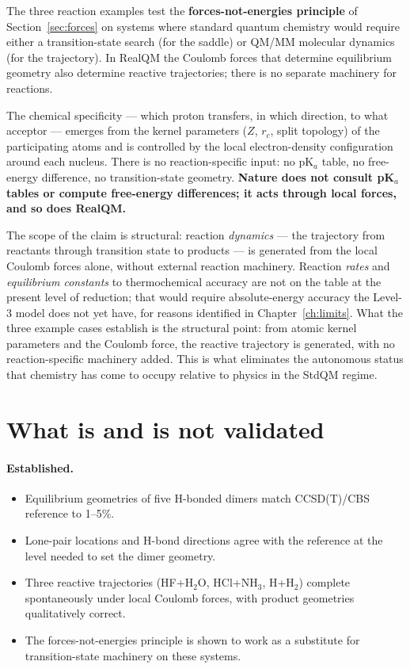 The three reaction examples test the \textbf{forces-not-energies principle} of Section~\ref{sec:forces} on systems where standard quantum chemistry would require either a transition-state search (for the saddle) or QM/MM molecular dynamics (for the trajectory). In RealQM the Coulomb forces that determine equilibrium geometry also determine reactive trajectories; there is no separate machinery for reactions.

The chemical specificity --- which proton transfers, in which direction, to what acceptor --- emerges from the kernel parameters ($Z$, $r_c$, split topology) of the participating atoms and is controlled by the local electron-density configuration around each nucleus. There is no reaction-specific input: no pK$_a$ table, no free-energy difference, no transition-state geometry. \textbf{Nature does not consult pK$_a$ tables or compute free-energy differences; it acts through local forces, and so does RealQM.}

The scope of the claim is structural: reaction \emph{dynamics} --- the trajectory from reactants through transition state to products --- is generated from the local Coulomb forces alone, without external reaction machinery. Reaction \emph{rates} and \emph{equilibrium constants} to thermochemical accuracy are not on the table at the present level of reduction; that would require absolute-energy accuracy the Level-3 model does not yet have, for reasons identified in Chapter~\ref{ch:limits}. What the three example cases establish is the structural point: from atomic kernel parameters and the Coulomb force, the reactive trajectory is generated, with no reaction-specific machinery added. This is what eliminates the autonomous status that chemistry has come to occupy relative to physics in the StdQM regime.

\section{What is and is not validated}\label{sec:dimer-summary}

\paragraph{Established.}
\begin{itemize}
\item Equilibrium geometries of five H-bonded dimers match CCSD(T)/CBS reference to 1--5\%.
\item Lone-pair locations and H-bond directions agree with the reference at the level needed to set the dimer geometry.
\item Three reactive trajectories (HF+H$_2$O, HCl+NH$_3$, H+H$_2$) complete spontaneously under local Coulomb forces, with product geometries qualitatively correct.
\item The forces-not-energies principle is shown to work as a substitute for transition-state machinery on these systems.
\end{itemize}

